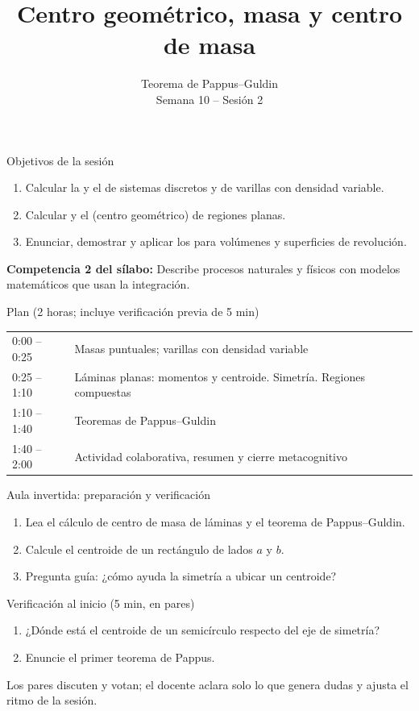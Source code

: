 \documentclass[10pt,aspectratio=169]{beamer}
\title[Centro de masa y Pappus]{Centro geométrico, masa y centro de masa}
\subtitle{Teorema de Pappus--Guldin\\[2pt]\small Semana 10 -- Sesión 2}
\begin{document}
\begin{frame}
  \titlepage
\end{frame}

\begin{frame}{Objetivos de la sesión}
  \begin{enumerate}
    \item Calcular la  y el  de sistemas discretos y de varillas con densidad variable.
    \item Calcular  y el  (centro geométrico) de regiones planas.
    \item Enunciar, demostrar y aplicar los  para volúmenes y superficies de revolución.
  \end{enumerate}
  \vspace{1mm}
  {\small\textbf{Competencia 2 del sílabo:} Describe procesos naturales y físicos con modelos matemáticos que usan la integración.}
  \begin{block}{Plan (2 horas; incluye verificación previa de 5 min)}
    \begin{tabular}{ll}
      0:00 -- 0:25 & Masas puntuales; varillas con densidad variable\\
      0:25 -- 1:10 & Láminas planas: momentos y centroide. Simetría. Regiones compuestas\\
      1:10 -- 1:40 & Teoremas de Pappus--Guldin\\
      1:40 -- 2:00 & Actividad colaborativa, resumen y cierre metacognitivo
    \end{tabular}
  \end{block}
\end{frame}

\begin{frame}{Aula invertida: preparación y verificación}
  \small
  \begin{previa}
    \begin{enumerate}
      \item Lea el cálculo de centro de masa de láminas y el teorema de Pappus--Guldin.
      \item Calcule el centroide de un rectángulo de lados $a$ y $b$.
      \item Pregunta guía: ¿cómo ayuda la simetría a ubicar un centroide?
    \end{enumerate}
  \end{previa}
  \begin{block}{Verificación al inicio (5 min, en pares)}
    \begin{enumerate}
      \item ¿Dónde está el centroide de un semicírculo respecto del eje de simetría?
      \item Enuncie el primer teorema de Pappus.
    \end{enumerate}
    Los pares discuten y votan; el docente aclara solo lo que genera dudas y ajusta el ritmo de la sesión.
  \end{block}
\end{frame}
\end{document}

